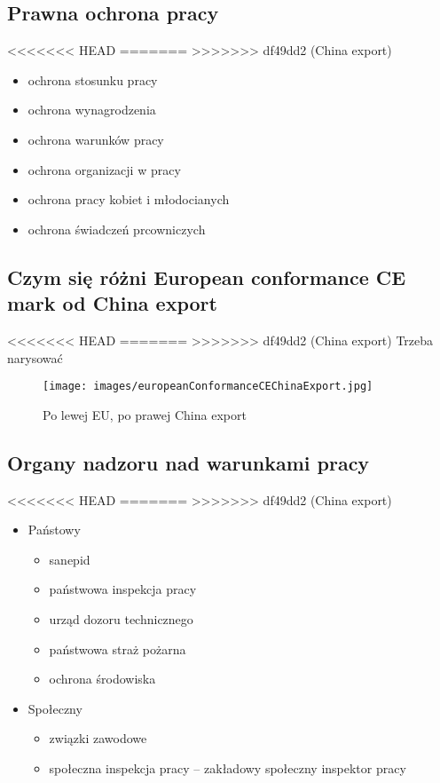 \documentclass[11pt]{article}
\begin{document}
\subsection{Prawna ochrona pracy}
<<<<<<< HEAD
\label{sec:org0bd9350}
=======
\label{sec:org27905ed}
>>>>>>> df49dd2 (China export)
\begin{itemize}
\item ochrona stosunku pracy
\item ochrona wynagrodzenia
\item ochrona warunków pracy
\item ochrona organizacji w pracy
\item ochrona pracy kobiet i młodocianych
\item ochrona świadczeń prcowniczych
\end{itemize}
\subsection{Czym się różni European conformance CE mark od China export}
<<<<<<< HEAD
\label{sec:org2fa742e}
=======
\label{sec:orgc31d2b5}
>>>>>>> df49dd2 (China export)
Trzeba narysować
\begin{figure}[htbp]
\centering
\texttt{[image: images/europeanConformanceCEChinaExport.jpg]}
\caption{Po lewej EU, po prawej China export}
\end{figure}
\subsection{Organy nadzoru nad warunkami pracy}
<<<<<<< HEAD
\label{sec:org789f36e}
=======
\label{sec:orga0a5afa}
>>>>>>> df49dd2 (China export)
\begin{itemize}
\item Państowy
\begin{itemize}
\item sanepid
\item państwowa inspekcja pracy
\item urząd dozoru technicznego
\item państwowa straż pożarna
\item ochrona środowiska
\end{itemize}
\item Społeczny
\begin{itemize}
\item związki zawodowe
\item społeczna inspekcja pracy -- zakładowy społeczny inspektor pracy
\end{itemize}
\end{itemize}
\end{document}
